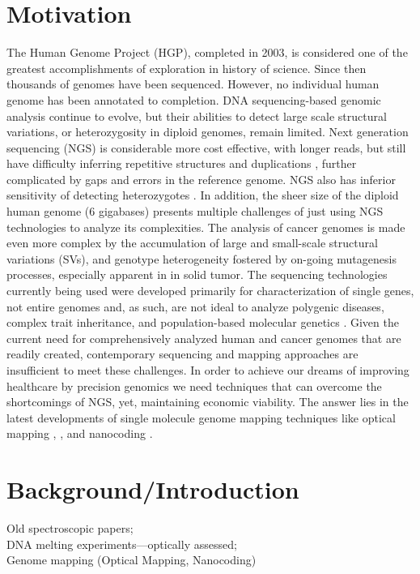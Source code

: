 \documentclass[11pt]{extarticle} %
\begin{document}
\section*{Motivation}
The Human Genome Project (HGP), completed in 2003, is considered one of the greatest accomplishments of exploration in history of science. Since then thousands of genomes have been sequenced. However, no individual human genome has been annotated to completion. DNA sequencing-based genomic analysis continue to evolve, but their abilities to detect large scale structural variations, or heterozygosity in diploid genomes, remain limited. Next generation sequencing (NGS) is considerable more cost effective, with longer reads, but still have difficulty inferring repetitive structures and duplications \cite{Lander_etal_2001_Nature}, further complicated by gaps and errors in the reference genome. NGS also has inferior sensitivity of detecting heterozygotes \cite{Wheeler_etal_2008_Nature}. In addition, the sheer size of the diploid human genome (6 gigabases) presents multiple challenges of just using NGS technologies to analyze its complexities. The analysis of cancer genomes is made even more complex by the accumulation of large and small-scale structural variations (SVs), and genotype heterogeneity fostered by on-going mutagenesis processes, especially apparent in in solid tumor. The sequencing technologies currently being used were developed  primarily for characterization of single genes, not entire genomes and, as such, are not ideal to analyze polygenic diseases, complex trait inheritance, and population-based molecular genetics \cite{Samad_etal_1995_GenomeResearch}. Given the current need for comprehensively analyzed human and cancer genomes that are readily created, contemporary sequencing and mapping approaches are insufficient to meet these challenges. In order to achieve our dreams of improving healthcare by precision genomics we need techniques that can overcome the shortcomings of NGS, yet, maintaining economic viability. The answer lies in the latest developments of single molecule genome mapping techniques like optical mapping \cite{Dimalanta_etal_2004_AnalChem}, \cite{Teague_etal_2010_PNAS}, and nanocoding \cite{Jo_etal_2007_PNAS}. 

\section*{Background/Introduction} 
Old spectroscopic papers; \\
DNA melting experiments—optically assessed; \\
Genome mapping  (Optical Mapping, Nanocoding) \\
\end{document}
